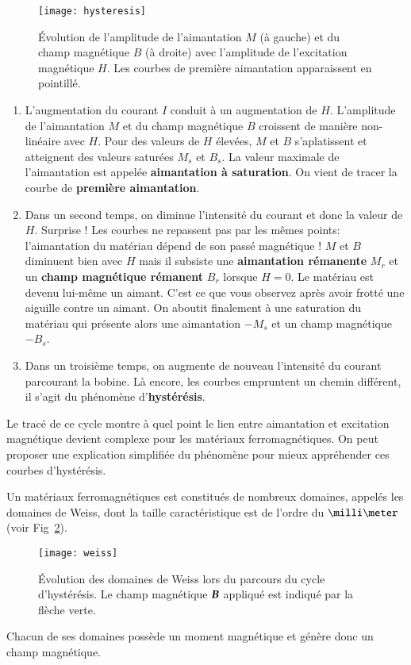 \begin{figure}[htpb]
	\centering
	\texttt{[image: hysteresis]}
	\caption{Évolution de l'amplitude de l'aimantation $M$ (à gauche) et du 
	champ magnétique $B$ (à droite) avec l'amplitude de l'excitation 
	magnétique $H$. Les courbes de première aimantation apparaissent
	en pointillé.}%
	\label{fig:hysteresis}
\end{figure}
\begin{enumerate}
	\item L'augmentation du courant $I$ conduit à un augmentation de $H$.
	  L'amplitude de l'aimantation $M$ et du champ magnétique $B$ croissent
	  de manière non-linéaire avec $H$. Pour des valeurs de $H$ élevées,
	  $M$ et $B$ s'aplatissent et atteignent des valeurs saturées
	  $M_s$ et $B_s$. 
	  La valeur maximale de l'aimantation est appelée \textbf{aimantation 
	  à saturation}. On vient de tracer la courbe de \textbf{première 
  	  aimantation}.
	\item Dans un second temps, on diminue l'intensité du courant et donc
	  la valeur de $H$. Surprise ! Les courbes ne repassent pas par les mêmes 
	  points: l'aimantation du matériau dépend de son passé magnétique !
	  $M$ et $B$ diminuent bien avec $H$ mais il subsiste une 
	  \textbf{aimantation rémanente} $M_r$ et un \textbf{champ magnétique
	  rémanent} $B_r$ lorsque $H = 0$. Le matériau est devenu lui-même
	  un aimant. C'est ce que vous observez après avoir frotté une aiguille
	  contre un aimant. On aboutit finalement à une saturation du matériau
	  qui présente alors une aimantation $-M_s$ et un champ magnétique $-B_s$.
	\item Dans un troisième temps, on augmente de nouveau l'intensité du courant
	  parcourant la bobine. Là encore, les courbes empruntent un chemin 
	  différent, il s'agit du phénomène d'\textbf{hystérésis}.
\end{enumerate}
Le tracé de ce cycle montre à quel point le lien entre aimantation et excitation
magnétique devient complexe pour les matériaux ferromagnétiques. On peut
proposer une explication simplifiée du phénomène pour mieux appréhender ces courbes
d'hystérésis. 

Un matériaux ferromagnétiques est constitués de nombreux domaines, appelés les
domaines de Weiss, dont la taille caractéristique est de l'ordre du $\milli 
\meter$ (voir Fig~\ref{fig:weiss}).
\begin{figure}[htpb]
	\centering
	\texttt{[image: weiss]}
	\caption{Évolution des domaines de Weiss lors du parcours du cycle
	d'hystérésis. Le champ magnétique $\vecb$ appliqué est indiqué par 
	la flèche verte.}%
	\label{fig:weiss}
\end{figure}
Chacun de ses domaines possède un moment magnétique
et génère donc un champ magnétique. 

